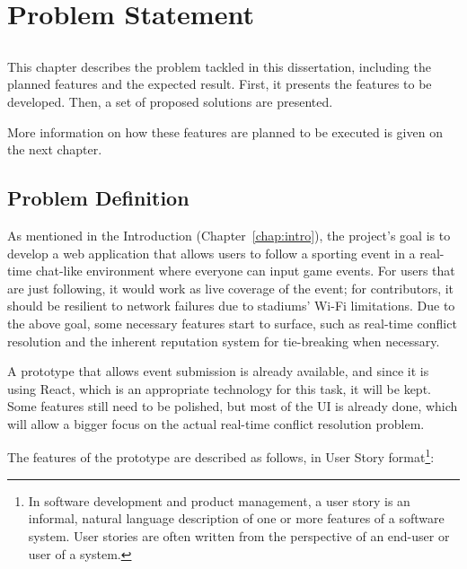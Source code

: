 \chapter{Problem Statement}\label{chap:problem}

\section*{}

This chapter describes the problem tackled in this dissertation, including the planned features and the expected result. First, it presents the features to be developed. Then, a set of proposed solutions are presented.

More information on how these features are planned to be executed is given on the next chapter.

\section{Problem Definition}\label{sec:prob-def}

As mentioned in the Introduction (Chapter~\ref{chap:intro}), the project's goal is to develop a web application that allows users to follow a sporting event in a real-time chat-like environment where everyone can input game events. For users that are just following, it would work as live coverage of the event; for contributors, it should be resilient to network failures due to stadiums' Wi-Fi limitations.
Due to the above goal, some necessary features start to surface, such as real-time conflict resolution and the inherent reputation system for tie-breaking when necessary. 

A prototype that allows event submission is already available, and since it is using React, which is an appropriate technology for this task, it will be kept. Some features still need to be polished, but most of the UI is already done, which will allow a bigger focus on the actual real-time conflict resolution problem.

The features of the prototype are described as follows, in User Story format\footnote{In software development and product management, a user story is an informal, natural language description of one or more features of a software system. User stories are often written from the perspective of an end-user or user of a system.}:


